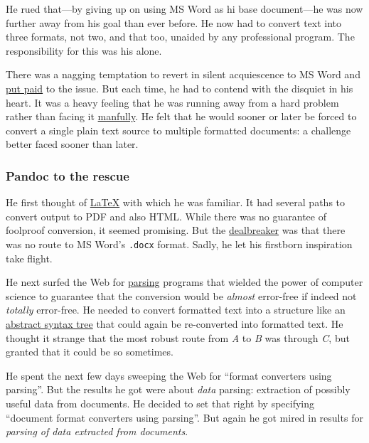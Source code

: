 \documentclass[
  british,
  a4paper,
  rgb,
  dvipsnames,
  svgnames,
  hyphens]{article}
\begin{document}
He rued that---by giving up on using MS Word as hi base document---he
was now further away from his goal than ever before. He now had to
convert text into three formats, not two, and that too, unaided by any
professional program. The responsibility for this was his alone.

There was a nagging temptation to revert in silent acquiescence to MS
Word and \href{https://www.phrases.org.uk/meanings/put-paid-to.html}{put
paid} to the issue. But each time, he had to contend with the disquiet
in his heart. It was a heavy feeling that he was running away from a
hard problem rather than facing it
\href{https://www.dictionary.com/browse/manful}{manfully}. He felt that
he would sooner or later be forced to convert a single plain text source
to multiple formatted documents: a challenge better faced sooner than
later.

\hypertarget{pandoc-to-the-rescue}{%
\subsubsection{Pandoc to the rescue}\label{pandoc-to-the-rescue}}

He first thought of \href{https://en.wikipedia.org/wiki/LaTeX}{LaTeX}
with which he was familiar. It had several paths to convert output to
PDF and also HTML. While there was no guarantee of foolproof conversion,
it seemed promising. But the
\href{https://dictionary.cambridge.org/dictionary/english/dealbreaker}{dealbreaker}
was that there was no route to MS Word's \texttt{.docx} format. Sadly,
he let his firstborn inspiration take flight.

He next surfed the Web for
\href{https://themightyprogrammer.dev/article/parsing}{parsing} programs
that wielded the power of computer science to guarantee that the
conversion would be \emph{almost} error-free if indeed not
\emph{totally} error-free. He needed to convert formatted text into a
structure like an
\href{https://en.wikipedia.org/wiki/Abstract_syntax_tree}{abstract
syntax tree} that could again be re-converted into formatted text. He
thought it strange that the most robust route from \emph{A} to \emph{B}
was through \emph{C}, but granted that it could be so sometimes.

He spent the next few days sweeping the Web for ``format converters
using parsing''. But the results he got were about \emph{data} parsing:
extraction of possibly useful data from documents. He decided to set
that right by specifying ``document format converters using parsing''.
But again he got mired in results for \emph{parsing of data extracted
from documents}.
\end{document}
